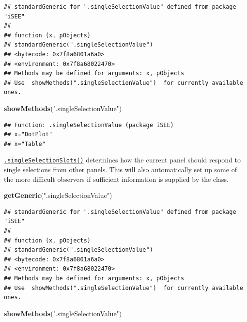 \documentclass[
]{book}
\newenvironment{Shaded}{\begin{snugshade}}{\end{snugshade}}
\newcommand{\KeywordTok}[1]{\textcolor[rgb]{0.13,0.29,0.53}{\textbf{#1}}}
\newcommand{\NormalTok}[1]{#1}
\newcommand{\StringTok}[1]{\textcolor[rgb]{0.31,0.60,0.02}{#1}}
\begin{document}
\begin{verbatim}
## standardGeneric for ".singleSelectionValue" defined from package "iSEE"
## 
## function (x, pObjects) 
## standardGeneric(".singleSelectionValue")
## <bytecode: 0x7f8a6801a6a0>
## <environment: 0x7f8a68022470>
## Methods may be defined for arguments: x, pObjects
## Use  showMethods(".singleSelectionValue")  for currently available ones.
\end{verbatim}

\begin{Shaded}
\begin{Highlighting}[]
\KeywordTok{showMethods}\NormalTok{(}\StringTok{".singleSelectionValue"}\NormalTok{)}
\end{Highlighting}
\end{Shaded}

\begin{verbatim}
## Function: .singleSelectionValue (package iSEE)
## x="DotPlot"
## x="Table"
\end{verbatim}

\href{https://isee.github.io/iSEE/reference/single-select-generics.html}{\texttt{.singleSelectionSlots()}} determines how the current panel should respond to single selections from other panels.
This will also automatically set up some of the more difficult observers if sufficient information is supplied by the class.

\begin{Shaded}
\begin{Highlighting}[]
\KeywordTok{getGeneric}\NormalTok{(}\StringTok{".singleSelectionValue"}\NormalTok{)}
\end{Highlighting}
\end{Shaded}

\begin{verbatim}
## standardGeneric for ".singleSelectionValue" defined from package "iSEE"
## 
## function (x, pObjects) 
## standardGeneric(".singleSelectionValue")
## <bytecode: 0x7f8a6801a6a0>
## <environment: 0x7f8a68022470>
## Methods may be defined for arguments: x, pObjects
## Use  showMethods(".singleSelectionValue")  for currently available ones.
\end{verbatim}

\begin{Shaded}
\begin{Highlighting}[]
\KeywordTok{showMethods}\NormalTok{(}\StringTok{".singleSelectionValue"}\NormalTok{)}
\end{Highlighting}
\end{Shaded}
\end{document}
